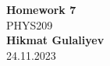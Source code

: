 \begin{titlepage}
    \begin{center}
    {\fontsize{40}{48}\selectfont \bfseries Homework 7} 
    \\\vspace{20pt}
    {\LARGE PHYS209} \\
    \vspace{20pt}
    \textbf{Hikmat Gulaliyev}
    \vspace{8pt}
    \\ 24.11.2023
    \end{center}
\end{titlepage}